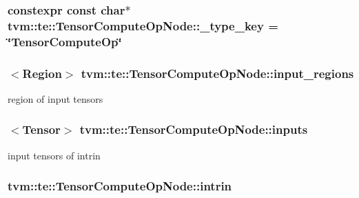\subsubsection[{\texorpdfstring{\+\_\+type\+\_\+key}{_type_key}}]{\setlength{\rightskip}{0pt plus 5cm}constexpr const char$\ast$ tvm\+::te\+::\+Tensor\+Compute\+Op\+Node\+::\+\_\+type\+\_\+key = \char`\"{}Tensor\+Compute\+Op\char`\"{}\hspace{0.3cm}{\ttfamily [static]}}\hypertarget{classtvm_1_1te_1_1TensorComputeOpNode_a56f1970ff8d8aed622587a68534335e2}{}\label{classtvm_1_1te_1_1TensorComputeOpNode_a56f1970ff8d8aed622587a68534335e2}
\subsubsection[{\texorpdfstring{input\+\_\+regions}{input_regions}}]{$<${\bf Region}$>$ tvm\+::te\+::\+Tensor\+Compute\+Op\+Node\+::input\+\_\+regions}\hypertarget{classtvm_1_1te_1_1TensorComputeOpNode_a0afdf35c3bb7d6affd303c467099667f}{}\label{classtvm_1_1te_1_1TensorComputeOpNode_a0afdf35c3bb7d6affd303c467099667f}


region of input tensors 

\subsubsection[{\texorpdfstring{inputs}{inputs}}]{$<${\bf Tensor}$>$ tvm\+::te\+::\+Tensor\+Compute\+Op\+Node\+::inputs}\hypertarget{classtvm_1_1te_1_1TensorComputeOpNode_a81533c6957c82df59ef8d810ace1bed2}{}\label{classtvm_1_1te_1_1TensorComputeOpNode_a81533c6957c82df59ef8d810ace1bed2}


input tensors of intrin 

\subsubsection[{\texorpdfstring{intrin}{intrin}}]{ tvm\+::te\+::\+Tensor\+Compute\+Op\+Node\+::intrin}\hypertarget{classtvm_1_1te_1_1TensorComputeOpNode_a29ad49d26c788d93489e0398be6804fd}{}\label{classtvm_1_1te_1_1TensorComputeOpNode_a29ad49d26c788d93489e0398be6804fd}


